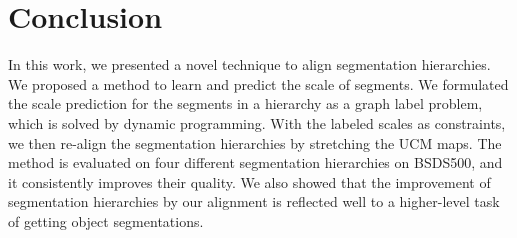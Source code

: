 

\section{Conclusion}
\label{sec:conclusions}
In this work, we presented a novel technique to align segmentation
hierarchies. We proposed a method to learn and predict the scale of
segments. We formulated the scale prediction for the segments in
a hierarchy as a graph label problem, which is solved by dynamic
programming. With the labeled scales as constraints, we then re-align
the segmentation hierarchies by stretching the UCM maps. The method
is evaluated on four different segmentation hierarchies on BSDS500, and it
consistently improves their quality.  We also showed
that the improvement of segmentation hierarchies by our alignment is
reflected well to a higher-level task of getting object segmentations.

%
%
%
%
